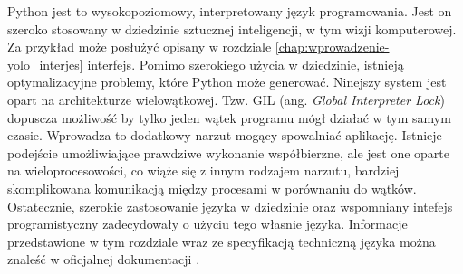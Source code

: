 Python jest to wysokopoziomowy, interpretowany język programowania. Jest on szeroko stosowany w dziedzinie sztucznej inteligencji, w tym wizji komputerowej. Za przykład może posłużyć opisany w rozdziale \ref{chap:wprowadzenie-yolo_interjes} interfejs. Pomimo szerokiego użycia w dziedzinie, istnieją optymalizacyjne problemy, które Python może generować. Ninejszy system jest opart na architekturze wielowątkowej. Tzw. GIL (ang. \emph{Global Interpreter Lock}) dopuscza możliwość by tylko jeden wątek programu mógł działać w tym samym czasie. Wprowadza to dodatkowy narzut mogący spowalniać aplikację. Istnieje podejście umożliwiające prawdziwe wykonanie współbierzne, ale jest one oparte na wieloprocesowości, co wiąże się z innym rodzajem narzutu, bardziej skomplikowana komunikacją między procesami w porównaniu do wątków. Ostatecznie, szerokie zastosowanie języka w dziedzinie oraz wspomniany intefejs programistyczny zadecydowały o użyciu tego własnie języka. Informacje przedstawione w tym rozdziale wraz ze specyfikacją techniczną języka można znaleść w oficjalnej dokumentacji \cite{Python_docs}. 